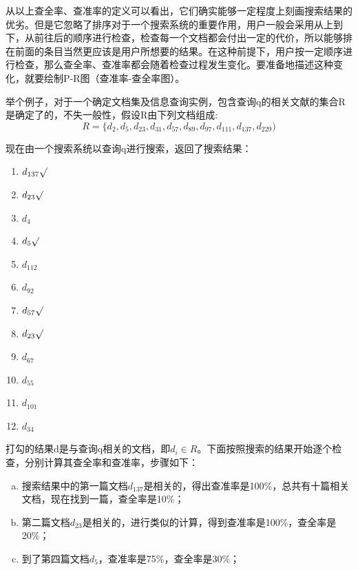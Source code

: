 \documentclass[12pt,a4paper]{article}
\begin{document}
	从以上查全率、查准率的定义可以看出，它们确实能够一定程度上刻画搜索结果的优劣。但是它忽略了排序对于一个搜索系统的重要作用，用户一般会采用从上到下，从前往后的顺序进行检查，检查每一个文档都会付出一定的代价，所以能够排在前面的条目当然更应该是用户所想要的结果。在这种前提下，用户按一定顺序进行检查，那么查全率、查准率都会随着检查过程发生变化。要准备地描述这种变化，就要绘制P-R图（查准率-查全率图）。
	
	举个例子，对于一个确定文档集及信息查询实例，包含查询q的相关文献的集合R是确定了的，不失一般性，假设R由下列文档组成:
	$$ R = \{d_{2},d_{5},d_{23},d_{31},d_{57},d_{89},d_{97},d_{111},d_{137},d_{229}) $$
	
	现在由一个搜索系统以查询q进行搜索，返回了搜索结果：
\begin{multicols}{4}
\begin{enumerate}
\item $d_{137} \surd$
\item $d_{23} \surd$ 
\item $d_{4}$
\item $d_{5} \surd$ 
\item $d_{112}$
\item $d_{92}$
\item $d_{57} \surd$
\item $d_{23} \surd$
\item $d_{67}$
\item $d_{55}$
\item $d_{101}$
\item $d_{34}$
\end{enumerate}
\end{multicols}

	打勾的结果d是与查询q相关的文档，即$d_i \in R$。下面按照搜索的结果开始逐个检查，分别计算其查全率和查准率，步骤如下：
\begin{enumerate}[a)]
\item
搜索结果中的第一篇文档$d_{137}$是相关的，得出查准率是100\%，总共有十篇相关文档，现在找到一篇，查全率是10\%；
\item
第二篇文档$d_{23}$是相关的，进行类似的计算，得到查准率是100\%，查全率是20\%；
\item
到了第四篇文档$d_{5}$，查准率是75\%，查全率是30\%；
\end{enumerate}
\end{document}
